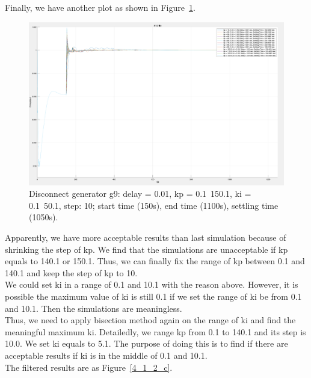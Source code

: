 Finally, we have another plot as shown in Figure~\ref{4_1_2_b}. \\

\begin{figure}[htbp]
\centering
\includegraphics[width = .819\textwidth]{figure/4_1_2_b.png}
\caption{Disconnect generator g9: delay = 0.01, kp = 0.1~150.1, ki = 0.1~50.1, step: 10; start time (150s), end time (1100s), settling time (1050s).}
\label{4_1_2_b}
\end{figure}


Apparently, we have more acceptable results than last simulation because of shrinking the step of kp. We find that the simulations are unacceptable if kp equals to 140.1 or 150.1. Thus, we can finally fix the range of kp between 0.1 and 140.1 and keep the step of kp to 10. \\

We could set ki in a range of 0.1 and 10.1 with the reason above. However, it is possible the maximum value of ki is still 0.1 if we set the range of ki be from 0.1 and 10.1. Then the simulations are meaningless. \\

Thus, we need to apply bisection method again on the range of ki and find the meaningful maximum ki. Detailedly, we range kp from 0.1 to 140.1 and its step is 10.0. We set ki equals to 5.1. The purpose of doing this is to find if there are acceptable results if ki is in the middle of 0.1 and 10.1.\\   

The filtered results are as Figure~\ref{4_1_2_c}. \\

